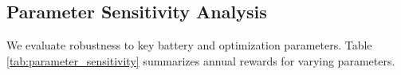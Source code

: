 \documentclass[10pt,twocolumn]{article}
\begin{document}
\subsection{Parameter Sensitivity Analysis}
We evaluate robustness to key battery and optimization parameters. Table \ref{tab:parameter_sensitivity} summarizes annual rewards for varying parameters.

\end{document}
